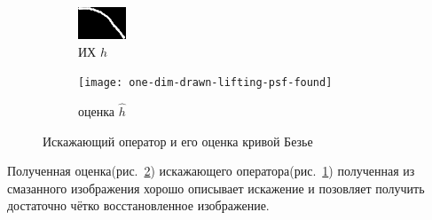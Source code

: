 \begin{figure}[h!]
	\centering
	\begin{subfigure}[t]{0.475\textwidth}
		\centering
		\includegraphics[width=0.3\linewidth]{../input/drawn-psf3}
		\caption{ИХ $h$}
		\label{fig:drawnPsf3Orig}
	\end{subfigure}
	\begin{subfigure}[t]{0.15\textwidth}
		\centering
		\texttt{[image: one-dim-drawn-lifting-psf-found]}
		\caption{оценка $\hat{h}$}
		\label{fig:drawnPsf3Estimation}
		
	\end{subfigure}
	\caption{Искажающий оператор и его оценка кривой Безье}
	\label{fig:drawnPsf3Est}
\end{figure}
Полученная оценка(рис.~\ref{fig:drawnPsf3Estimation}) искажающего оператора(рис.~\ref{fig:drawnPsf3Orig}) полученная из смазанного изображения хорошо описывает искажение и позовляет получить достаточно чётко восстановленное изображение.


